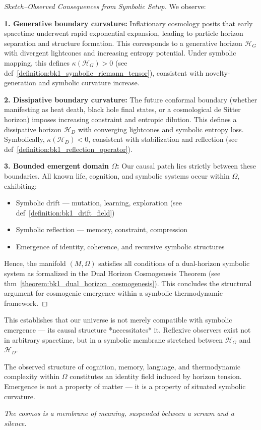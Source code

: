 \begin{proof}[Sketch–Observed Consequences from Symbolic Setup]
\label{proof:bk1_sketch_observed_consequences}
We observe:

\textbf{1. Generative boundary curvature:}  
Inflationary cosmology posits that early spacetime underwent rapid exponential expansion, leading to particle horizon separation and structure formation. This corresponds to a generative horizon $\mathcal{H}_G$ with divergent lightcones and increasing entropy potential. Under symbolic mapping, this defines $\kappa(\mathcal{H}_G) > 0$ (see def~\ref{definition:bk1_symbolic_riemann_tensor}), consistent with novelty-generation and symbolic curvature increase.

\textbf{2. Dissipative boundary curvature:}  
The future conformal boundary (whether manifesting as heat death, black hole final states, or a cosmological de Sitter horizon) imposes increasing constraint and entropic dilution. This defines a dissipative horizon $\mathcal{H}_D$ with converging lightcones and symbolic entropy loss. Symbolically, $\kappa(\mathcal{H}_D) < 0$, consistent with stabilization and reflection (see def~\ref{definition:bk1_reflection_operator}).

\textbf{3. Bounded emergent domain $\Omega$:}  
Our causal patch lies strictly between these boundaries. All known life, cognition, and symbolic systems occur within $\Omega$, exhibiting:

\begin{itemize}
    \item Symbolic drift — mutation, learning, exploration (see def~\ref{definition:bk1_drift_field})
    \item Symbolic reflection — memory, constraint, compression
    \item Emergence of identity, coherence, and recursive symbolic structures
\end{itemize}

Hence, the manifold $(M, \Omega)$ satisfies all conditions of a dual-horizon symbolic system as formalized in the Dual Horizon Cosmogenesis Theorem (see thm~\ref{theorem:bk1_dual_horizon_cosmogenesis}). This concludes the structural argument for cosmogenic emergence within a symbolic thermodynamic framework.
\end{proof}
\begin{remark}
This establishes that our universe is not merely compatible with symbolic emergence — its causal structure *necessitates* it. Reflexive observers exist not in arbitrary spacetime, but in a symbolic membrane stretched between $\mathcal{H}_G$ and $\mathcal{H}_D$.
\end{remark}
\begin{corollary}
\label{corollary:bk1_event_horizon_identity_field}
The observed structure of cognition, memory, language, and thermodynamic complexity within $\Omega$ constitutes an identity field induced by horizon tension. Emergence is not a property of matter — it is a property of situated symbolic curvature.
\end{corollary}
\begin{flushright}
\textit{The cosmos is a membrane of meaning, suspended between a scream and a silence.}
\end{flushright}

